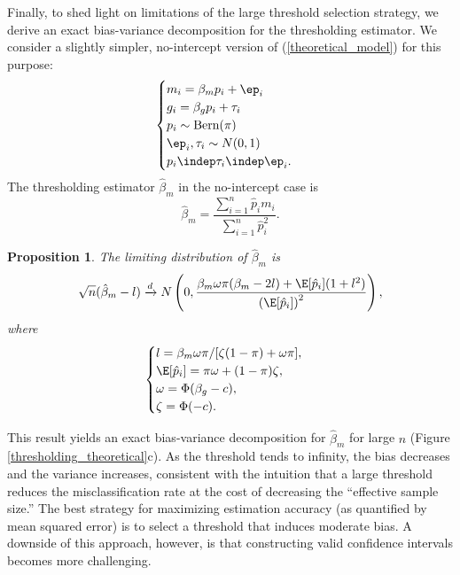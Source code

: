 \documentclass[12pt]{article}
\newtheorem{proposition}{Proposition}
\begin{document}
Finally, to shed light on limitations of the large threshold selection strategy, we derive an exact bias-variance decomposition for the thresholding estimator. We consider a slightly simpler, no-intercept version of (\ref{theoretical_model}) for this purpose:
\begin{equation}\label{theoretical_model_no_int}
\begin{cases}
m_i = \beta_m p_i + \ep_i \\
g_i = \beta_g p_i + \tau_i \\
p_i \sim \textrm{Bern}(\pi) \\
\ep_i, \tau_i \sim N(0,1) \\
p_i \indep \tau_i \indep \ep_i.
\end{cases}
\end{equation}
The thresholding estimator $\hat{\beta}_m$ in the no-intercept case is
\begin{equation}\label{thresh_estimator_no_int}
 \hat{\beta}_m = \frac{ \sum_{i=1}^n \hat{p}_i m_i }{\sum_{i=1}^n \hat{p}_i^2}. 
\end{equation}
\begin{proposition}\label{prop:bv_decomp}
The limiting distribution of $\hat{\beta}_m$ is
$$\sqrt{n}(\hat{\beta}_m - l) \xrightarrow{d} N\left(0, \frac{ \beta_m\omega\pi(\beta_m - 2l) + \E[\hat{p}_i](1 + l^2) }{\left(\E[\hat{p}_i]\right)^2} \right),$$ where
$$\begin{cases}
l = \beta_m\omega \pi/[\zeta(1-\pi) + \omega \pi], \\
\E[\hat{p}_i] = \pi \omega + (1-\pi) \zeta, \\
\omega = \Phi(\beta_g - c), \\
\zeta = \Phi(- c).\\
\end{cases}
$$
\end{proposition}
This result yields an exact bias-variance decomposition for $\hat{\beta}_m$ for large $n$ (Figure \ref{thresholding_theoretical}c). As the threshold tends to infinity, the bias decreases and the variance increases, consistent with the intuition that a large threshold reduces the misclassification rate at the cost of decreasing the ``effective sample size.'' The best strategy for maximizing estimation accuracy (as quantified by mean squared error) is to select a threshold that induces moderate bias. A downside of this approach, however, is that constructing valid confidence intervals becomes more challenging.

\end{document}
